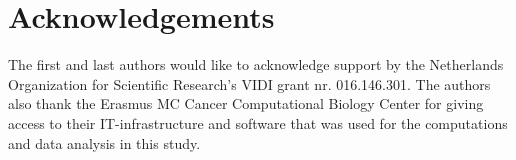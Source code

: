 
\section*{Acknowledgements}
The first and last authors would like to acknowledge support by the Netherlands Organization for Scientific Research's VIDI grant nr. 016.146.301. The authors also thank the Erasmus MC Cancer Computational Biology Center for giving access to their IT-infrastructure and software that was used for the computations and data analysis in this study.\vspace*{-8pt}